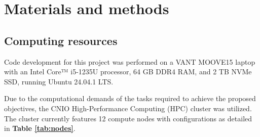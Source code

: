 \chapter{Materials and methods}

\section{Computing resources}

Code development for this project was performed on a VANT MOOVE15 laptop with an 
Intel\regsup{} Core™ i5-1235U processor, 64 GB DDR4 RAM, and 2 TB NVMe SSD, 
running Ubuntu 24.04.1 LTS.



Due to the computational demands of the tasks required to achieve the proposed
objectives, the CNIO High-Performance Computing (HPC) cluster was utilized. 
The cluster currently features 12 compute nodes with configurations as detailed 
in \textbf{Table \ref{tab:nodes}}.

\begingroup
\vspace{0.30cm}
\footnotesize


